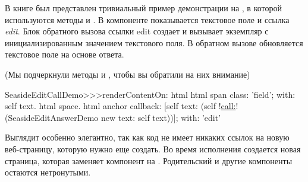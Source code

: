 \documentclass[a4paper,10pt,twoside]{book}
\begin{document}

В книге был представлен тривиальный пример демонстрации на
, в которой используются методы  и .
В компоненте  показывается текстовое поле и ссылка
\emph{edit}.
Блок обратного вызова ссылки edit создает и вызывает экземпляр
 с инициализированным значением текстового поля.
В обратном вызове обновляется текстовое поле на основе ответа.


(Мы подчеркнули методы  и , чтобы вы обратили
на них внимание)

\begin{code}{}
SeasideEditCallDemo>>>renderContentOn: html 
	html span
		class: 'field';
		with: self text.
	html space.
	html anchor
callback: [self text: (self !\underline{call:}! (SeasideEditAnswerDemo new text: self
text))];
		with: 'edit'
\end{code}{}


Выглядит особенно элегантно, так как код не имеет никаких ссылок на
новую веб-страницу, которую нужно еще создать.
Во время исполнения создается новая страница, которая заменяет
компонент  на .
Родительский и другие компоненты остаются нетронутыми.


\end{document}
